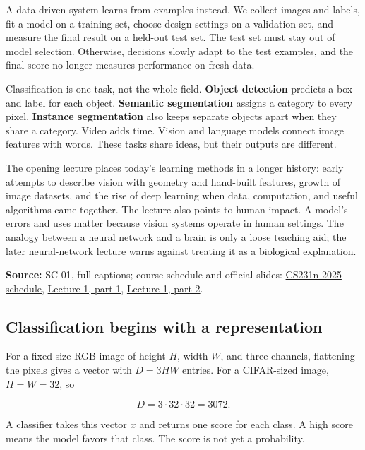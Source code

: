 A data-driven system learns from examples instead. We collect images and labels, fit a model on a training set, choose design settings on a validation set, and measure the final result on a held-out test set. The test set must stay out of model selection. Otherwise, decisions slowly adapt to the test examples, and the final score no longer measures performance on fresh data.

Classification is one task, not the whole field. \textbf{Object detection} predicts a box and label for each object. \textbf{Semantic segmentation} assigns a category to every pixel. \textbf{Instance segmentation} also keeps separate objects apart when they share a category. Video adds time. Vision and language models connect image features with words. These tasks share ideas, but their outputs are different.

The opening lecture places today's learning methods in a longer history: early attempts to describe vision with geometry and hand-built features, growth of image datasets, and the rise of deep learning when data, computation, and useful algorithms came together. The lecture also points to human impact. A model's errors and uses matter because vision systems operate in human settings. The analogy between a neural network and a brain is only a loose teaching aid; the later neural-network lecture warns against treating it as a biological explanation.

\textbf{Source:} SC-01, full captions; course schedule and official slides: \href{https://cs231n.stanford.edu/2025/schedule.html}{CS231n 2025 schedule}, \href{https://cs231n.stanford.edu/slides/2025/lecture_1_part_1.pdf}{Lecture 1, part 1}, \href{https://cs231n.stanford.edu/slides/2025/lecture_1_part_2.pdf}{Lecture 1, part 2}.

\subsection{Classification begins with a representation}\label{04-visual-computing-ii-ch031-classification-begins-with-a-representation}

\hypertarget{04-visual-computing-ii-ch031-classification-begins-with-a-representation}{}

For a fixed-size RGB image of height \(H\), width \(W\), and three channels, flattening the pixels gives a vector with \(D=3HW\) entries. For a CIFAR-sized image, \(H=W=32\), so

\[D=3\cdot32\cdot32=3072.\]

A classifier takes this vector \(x\) and returns one score for each class. A high score means the model favors that class. The score is not yet a probability.

